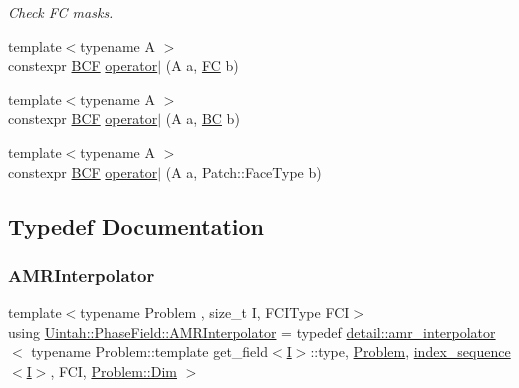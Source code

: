 \begin{DoxyCompactItemize}
\begin{DoxyCompactList}\small\item\em Check FC masks. \end{DoxyCompactList}\item 
{\footnotesize template$<$typename A $>$ }\\constexpr \hyperlink{namespaceUintah_1_1PhaseField_ab9b5949afaa59b9b862e606410431331}{B\+CF} \hyperlink{namespaceUintah_1_1PhaseField_acafefaa50f1ec411fdb981feac59c488}{operator$\vert$} (A a, \hyperlink{namespaceUintah_1_1PhaseField_aeb51fe956fe07f1487f5878f4039f27c}{FC} b)
\item 
{\footnotesize template$<$typename A $>$ }\\constexpr \hyperlink{namespaceUintah_1_1PhaseField_ab9b5949afaa59b9b862e606410431331}{B\+CF} \hyperlink{namespaceUintah_1_1PhaseField_aa2de98442fe079b97ff71c974452edf2}{operator$\vert$} (A a, \hyperlink{namespaceUintah_1_1PhaseField_a148fba372aa3be96fd6eede7a2fa10b5}{BC} b)
\item 
{\footnotesize template$<$typename A $>$ }\\constexpr \hyperlink{namespaceUintah_1_1PhaseField_ab9b5949afaa59b9b862e606410431331}{B\+CF} \hyperlink{namespaceUintah_1_1PhaseField_aef70a549ef150398587c759d5676b128}{operator$\vert$} (A a, Patch\+::\+Face\+Type b)
\end{DoxyCompactItemize}


\subsection{Typedef Documentation}
\mbox{\label{namespaceUintah_1_1PhaseField_a2188fd3571014276c1445391573d263d}} 
\subsubsection{\texorpdfstring{A\+M\+R\+Interpolator}{AMRInterpolator}}
{\footnotesize\ttfamily template$<$typename Problem , size\+\_\+t I, F\+C\+I\+Type F\+CI$>$ \\
using \hyperlink{namespaceUintah_1_1PhaseField_a2188fd3571014276c1445391573d263d}{Uintah\+::\+Phase\+Field\+::\+A\+M\+R\+Interpolator} = typedef \hyperlink{classUintah_1_1PhaseField_1_1detail_1_1amr__interpolator}{detail\+::amr\+\_\+interpolator} $<$ typename Problem\+::template get\+\_\+field$<$\hyperlink{structUintah_1_1PhaseField_1_1I}{I}$>$\+::type, \hyperlink{classUintah_1_1PhaseField_1_1Problem}{Problem}, \hyperlink{namespaceUintah_1_1PhaseField_a237de804d99512e50613aff7c94a9461}{index\+\_\+sequence}$<$\hyperlink{structUintah_1_1PhaseField_1_1I}{I}$>$, F\+CI, \hyperlink{classUintah_1_1PhaseField_1_1Problem_a23dbecf657023dd405fc40939661c550}{Problem\+::\+Dim} $>$}



